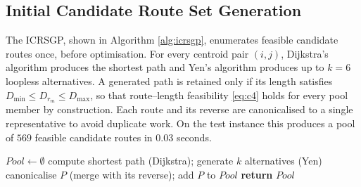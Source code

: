 \documentclass [a4paper, 11pt, titlepage] {article}
\begin{document}
\subsection{Initial Candidate Route Set Generation}
The ICRSGP, shown in Algorithm \ref{alg:icrsgp}, enumerates feasible candidate
routes once, before optimisation. For every centroid pair $(i,j)$, Dijkstra's
algorithm \cite{ahuja1993} produces the shortest path and Yen's algorithm
\cite{yen1971} produces up to $k=6$ loopless alternatives. A generated path is
retained only if its length satisfies $D_{\min} \leq D_{r_m} \leq D_{\max}$, so
that route--length feasibility \eqref{eq:c4} holds for every pool member by
construction. Each route and its reverse are canonicalised to a single
representative to avoid duplicate work. On the test instance this produces a
pool of $569$ feasible candidate routes in $0.03$ seconds.

\begin{algorithm}
  \caption{ICRSGP} \label{alg:icrsgp}
  \begin{algorithmic}[1]
    \STATE $Pool \leftarrow \emptyset$
      \STATE compute shortest path (Dijkstra); generate $k$ alternatives (Yen)
          \STATE canonicalise $P$ (merge with its reverse); add $P$ to $Pool$
        \ENDIF
      \ENDFOR
    \ENDFOR
    \STATE \textbf{return} $Pool$
  \end{algorithmic}
\end{algorithm}
\end{document}
